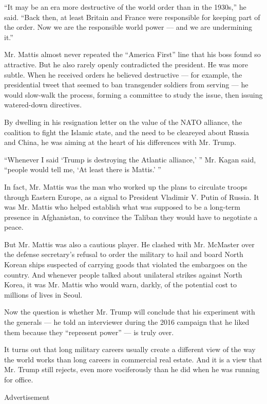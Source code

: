 ``It may be an era more destructive of the world order than in the
1930s,'' he said. ``Back then, at least Britain and France were
responsible for keeping part of the order. Now we are the responsible
world power --- and we are undermining it.''

Mr. Mattis almost never repeated the ``America First'' line that his
boss found so attractive. But he also rarely openly contradicted the
president. He was more subtle. When he received orders he believed
destructive --- for example, the presidential tweet that seemed to ban
transgender soldiers from serving --- he would slow-walk the process,
forming a committee to study the issue, then issuing watered-down
directives.

By dwelling in his resignation letter on the value of the NATO alliance,
the coalition to fight the Islamic state, and the need to be cleareyed
about Russia and China, he was aiming at the heart of his differences
with Mr. Trump.

``Whenever I said `Trump is destroying the Atlantic alliance,' '' Mr.
Kagan said, ``people would tell me, `At least there is Mattis.' ''

In fact, Mr. Mattis was the man who worked up the plans to circulate
troops through Eastern Europe, as a signal to President Vladimir V.
Putin of Russia. It was Mr. Mattis who helped establish what was
supposed to be a long-term presence in Afghanistan, to convince the
Taliban they would have to negotiate a peace.

But Mr. Mattis was also a cautious player. He clashed with Mr. McMaster
over the defense secretary's refusal to order the military to hail and
board North Korean ships suspected of carrying goods that violated the
embargoes on the country. And whenever people talked about unilateral
strikes against North Korea, it was Mr. Mattis who would warn, darkly,
of the potential cost to millions of lives in Seoul.

Now the question is whether Mr. Trump will conclude that his experiment
with the generals --- he told an interviewer during the 2016 campaign
that he liked them because they ``represent power'' --- is truly over.

It turns out that long military careers usually create a different view
of the way the world works than long careers in commercial real estate.
And it is a view that Mr. Trump still rejects, even more vociferously
than he did when he was running for office.

Advertisement

